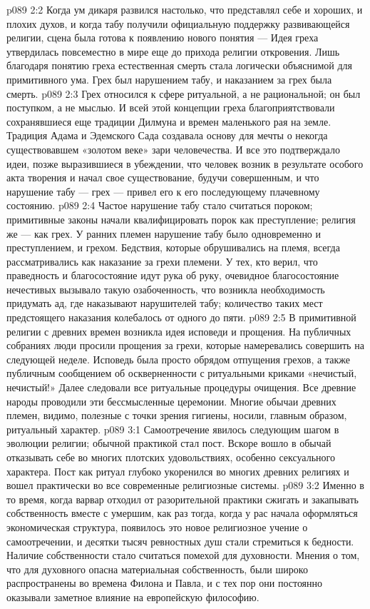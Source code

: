 \vs p089 2:2 Когда ум дикаря развился настолько, что представлял себе и хороших, и плохих духов, и когда табу получили официальную поддержку развивающейся религии, сцена была готова к появлению нового понятия ---  Идея греха утвердилась повсеместно в мире еще до прихода религии откровения. Лишь благодаря понятию греха естественная смерть стала логически объяснимой для примитивного ума. Грех был нарушением табу, и наказанием за грех была смерть.
\vs p089 2:3 Грех относился к сфере ритуальной, а не рациональной; он был поступком, а не мыслью. И всей этой концепции греха благоприятствовали сохранявшиеся еще традиции Дилмуна и времен маленького рая на земле. Традиция Адама и Эдемского Сада создавала основу для мечты о некогда существовавшем «золотом веке» зари человечества. И все это подтверждало идеи, позже выразившиеся в убеждении, что человек возник в результате особого акта творения и начал свое существование, будучи совершенным, и что нарушение табу --- грех --- привел его к его последующему плачевному состоянию.
\vs p089 2:4 Частое нарушение табу стало считаться пороком; примитивные законы начали квалифицировать порок как преступление; религия же --- как грех. У ранних племен нарушение табу было одновременно и преступлением, и грехом. Бедствия, которые обрушивались на племя, всегда рассматривались как наказание за грехи племени. У тех, кто верил, что праведность и благосостояние идут рука об руку, очевидное благосостояние нечестивых вызывало такую озабоченность, что возникла необходимость придумать ад, где наказывают нарушителей табу; количество таких мест предстоящего наказания колебалось от одного до пяти.
\vs p089 2:5 В примитивной религии с древних времен возникла идея исповеди и прощения. На публичных собраниях люди просили прощения за грехи, которые намеревались совершить на следующей неделе. Исповедь была просто обрядом отпущения грехов, а также публичным сообщением об оскверненности с ритуальными криками «нечистый, нечистый!» Далее следовали все ритуальные процедуры очищения. Все древние народы проводили эти бессмысленные церемонии. Многие обычаи древних племен, видимо, полезные с точки зрения гигиены, носили, главным образом, ритуальный характер.
\vs p089 3:1 Самоотречение явилось следующим шагом в эволюции религии; обычной практикой стал пост. Вскоре вошло в обычай отказывать себе во многих плотских удовольствиях, особенно сексуального характера. Пост как ритуал глубоко укоренился во многих древних религиях и вошел практически во все современные религиозные системы.
\vs p089 3:2 Именно в то время, когда варвар отходил от разорительной практики сжигать и закапывать собственность вместе с умершим, как раз тогда, когда у рас начала оформляться экономическая структура, появилось это новое религиозное учение о самоотречении, и десятки тысяч ревностных душ стали стремиться к бедности. Наличие собственности стало считаться помехой для духовности. Мнения о том, что для духовного опасна материальная собственность, были широко распространены во времена Филона и Павла, и с тех пор они постоянно оказывали заметное влияние на европейскую философию.
